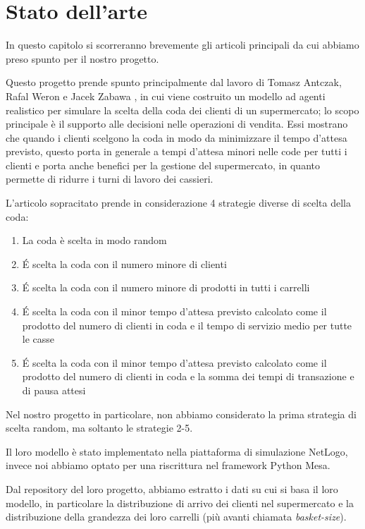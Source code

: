 \chapter{Stato dell'arte}
\label{chapter:sota}

In questo capitolo si scorreranno brevemente gli articoli principali da cui abbiamo preso spunto per il nostro progetto. 

\vspace*{1\baselineskip}

Questo progetto prende spunto principalmente dal lavoro di Tomasz Antczak, Rafal Weron e Jacek Zabawa \cite{article1}, in cui viene costruito un modello ad agenti realistico per simulare la scelta della coda dei clienti di un supermercato; lo scopo principale è il supporto alle decisioni nelle operazioni di vendita. Essi mostrano che quando i clienti scelgono la coda in modo da minimizzare il tempo d'attesa previsto, questo porta in generale a tempi d'attesa minori nelle code per tutti i clienti e porta anche benefici per la gestione del supermercato, in quanto permette di ridurre i turni di lavoro dei cassieri.

L'articolo sopracitato prende in considerazione 4 strategie diverse di scelta della coda:

\begin{enumerate}
	\item La coda è scelta in modo random
	\item \'E scelta la coda con il numero minore di clienti
	\item \'E scelta la coda con il numero minore di prodotti in tutti i carrelli
	\item \'E scelta la coda con il minor tempo d'attesa previsto calcolato come il prodotto del numero di clienti in coda e il tempo di servizio medio per tutte le casse
	\item \'E scelta la coda con il minor tempo d'attesa previsto calcolato come il prodotto del numero di clienti in coda e la somma dei tempi di transazione e di pausa attesi
\end{enumerate}

Nel nostro progetto in particolare, non abbiamo considerato la prima strategia di scelta random, ma soltanto le strategie 2-5.

Il loro modello è stato implementato nella piattaforma di simulazione NetLogo, invece noi abbiamo optato per una riscrittura nel framework Python Mesa. 

Dal repository del loro progetto, abbiamo estratto i dati su cui si basa il loro modello, in particolare la distribuzione di arrivo dei clienti nel supermercato e la distribuzione della grandezza dei loro carrelli (più avanti chiamata \textit{basket-size}).

